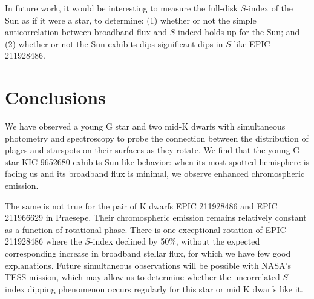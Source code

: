 In future work, it would be interesting to measure the full-disk $S$-index of the Sun as if it were a star, to determine: (1) whether or not the simple anticorrelation between broadband flux and $S$ indeed holds up for the Sun; and (2) whether or not the Sun exhibits dips significant dips in $S$ like EPIC 211928486.

\section{Conclusions} \label{sec:conclusion}

We have observed a young G star and two mid-K dwarfs with simultaneous photometry and spectroscopy to probe the connection between the distribution of plages and starspots on their surfaces as they rotate. We find that the young G star KIC 9652680 exhibits Sun-like behavior: when its most spotted hemisphere is facing us and its broadband \kepler flux is minimal, we observe enhanced chromospheric emission. 

The same is not true for the pair of K dwarfs EPIC 211928486 and EPIC 211966629 in Praesepe. Their chromospheric emission remains relatively constant as a function of rotational phase. There is one exceptional rotation of EPIC 211928486 where the $S$-index declined by 50\%, without the expected corresponding increase in broadband stellar flux, for which we have few good explanations. Future simultaneous observations will be possible with NASA's TESS mission, which may allow us to determine whether the uncorrelated $S$-index dipping phenomenon occurs regularly for this star or mid K dwarfs like it.

%
%


